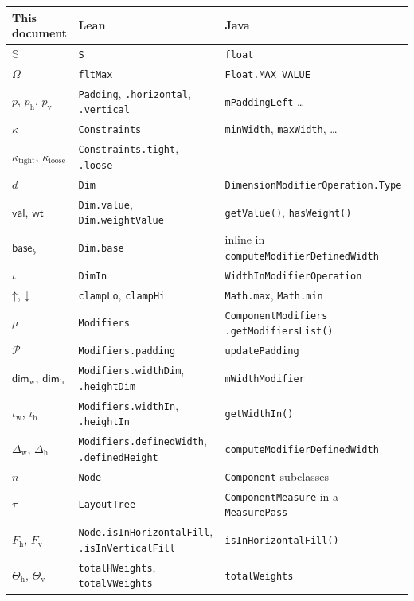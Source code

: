 \documentclass[11pt,a4paper]{article}
\newcommand{\Sc}{\mathbb{S}}
\newcommand{\Om}{\Omega}
\newcommand{\Pp}{\mathcal{P}}          %
\newcommand{\Dw}{\Delta_{\mathrm{w}}}
\newcommand{\Dh}{\Delta_{\mathrm{h}}}
\newcommand{\Iw}{\iota_{\mathrm{w}}}
\newcommand{\Ih}{\iota_{\mathrm{h}}}
\newcommand{\Dimw}{\mathsf{dim}_{\mathrm{w}}}
\newcommand{\Dimh}{\mathsf{dim}_{\mathrm{h}}}
\newcommand{\base}{\mathsf{base}}
\newcommand{\val}{\mathsf{val}}
\newcommand{\wt}{\mathsf{wt}}
\newcommand{\clampL}{\mathord{\uparrow}}
\newcommand{\clampH}{\mathord{\downarrow}}
\newcommand{\lo}[1]{\texttt{#1}}       %
\newcommand{\jv}[1]{\texttt{#1}}       %
\theoremstyle{definition}
\theoremstyle{plain}
\theoremstyle{remark}
\begin{document}
\begin{center}
\small
\begin{longtable}{@{}
  >{\raggedright\arraybackslash}p{}
  >{\raggedright\arraybackslash}p{}
  >{\raggedright\arraybackslash}p{}@{}}
\toprule
\textbf{This document} & \textbf{Lean} & \textbf{Java} \\
\midrule
\endhead
$\Sc$ & \lo{S} & \jv{float} \\
$\Om$ & \lo{fltMax} & \jv{Float.MAX\_VALUE} \\
$p$, $p_{\mathrm{h}}$, $p_{\mathrm{v}}$ & \lo{Padding}, \lo{.horizontal}, \lo{.vertical}
  & \jv{mPaddingLeft} \dots \\
$\kappa$ & \lo{Constraints} & \jv{minWidth}, \jv{maxWidth}, \dots \\
$\kappa_{\mathrm{tight}}$, $\kappa_{\mathrm{loose}}$ & \lo{Constraints.tight}, \lo{.loose} & --- \\
$d$ & \lo{Dim} & \jv{DimensionModifierOperation.Type} \\
$\val$, $\wt$ & \lo{Dim.value}, \lo{Dim.weightValue} & \jv{getValue()}, \jv{hasWeight()} \\
$\base_b$ & \lo{Dim.base} & inline in \jv{computeModifierDefinedWidth} \\
$\iota$ & \lo{DimIn} & \jv{WidthInModifierOperation} \\
$\clampL$, $\clampH$ & \lo{clampLo}, \lo{clampHi} & \jv{Math.max}, \jv{Math.min} \\
$\mu$ & \lo{Modifiers} & \jv{ComponentModifiers} \newline \jv{.getModifiersList()} \\
$\Pp$ & \lo{Modifiers.padding} & \jv{updatePadding} \\
$\Dimw$, $\Dimh$ & \lo{Modifiers.widthDim}, \lo{.heightDim} & \jv{mWidthModifier} \\
$\Iw$, $\Ih$ & \lo{Modifiers.widthIn}, \lo{.heightIn} & \jv{getWidthIn()} \\
$\Dw$, $\Dh$ & \lo{Modifiers.definedWidth}, \lo{.definedHeight} & \jv{computeModifierDefinedWidth} \\
$n$ & \lo{Node} & \jv{Component} subclasses \\
$\tau$ & \lo{LayoutTree} & \jv{ComponentMeasure} in a \jv{MeasurePass} \\
$F_{\mathrm{h}}$, $F_{\mathrm{v}}$ & \lo{Node.isInHorizontalFill}, \lo{.isInVerticalFill}
  & \jv{isInHorizontalFill()} \\
$\Theta_{\mathrm{h}}$, $\Theta_{\mathrm{v}}$ & \lo{totalHWeights}, \lo{totalVWeights} & \jv{totalWeights} \\

\end{longtable}
\end{center}
\end{document}
